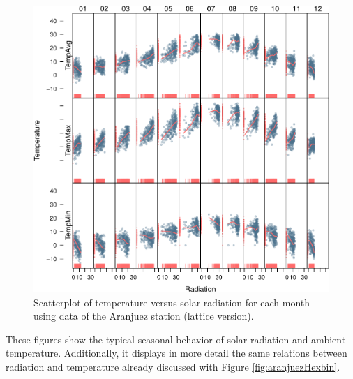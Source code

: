 \begin{figure}[htbp]
\centering
\includegraphics[width=.9\linewidth]{figs/aranjuezOuterStrips.pdf}
\caption{Scatterplot of temperature versus solar radiation for each month using data of the Aranjuez station (lattice version). \label{fig:aranjuezOuterStrips}}
\end{figure}

These figures show the typical seasonal behavior of solar radiation
and ambient temperature. Additionally, it displays in more detail the
same relations between radiation and temperature already discussed
with Figure \ref{fig:aranjuezHexbin}.
